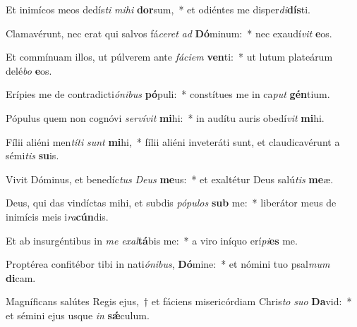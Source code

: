 \item Et inimícos meos dedís\textit{ti} \textit{mi}\textit{hi} \textbf{dor}sum,~* et odiéntes me disper\textit{di}\textbf{dís}ti.
\item Clamavérunt, nec erat qui salvos fá\textit{ce}\textit{ret} \textit{ad} \textbf{Dó}minum:~* nec exaudí\textit{vit} \textbf{e}os.
\item Et commínuam illos, ut púlverem ante \textit{fá}\textit{ci}\textit{em} \textbf{ven}ti:~* ut lutum plateárum delé\textit{bo} \textbf{e}os.
\item Erípies me de contradicti\textit{ó}\textit{ni}\textit{bus} \textbf{pó}puli:~* constítues me in ca\textit{put} \textbf{gén}tium.
\item Pópulus quem non cognóvi \textit{ser}\textit{ví}\textit{vit} \textbf{mi}hi:~* in audítu auris obedí\textit{vit} \textbf{mi}hi.
\item Fílii aliéni men\textit{tí}\textit{ti} \textit{sunt} \textbf{mi}hi,~* fílii aliéni inveteráti sunt, et claudicavérunt a sémi\textit{tis} \textbf{su}is.
\item Vivit Dóminus, et benedíc\textit{tus} \textit{De}\textit{us} \textbf{me}us:~* et exaltétur Deus salú\textit{tis} \textbf{me}æ.
\item Deus, qui das vindíctas mihi, et subdis \textit{pó}\textit{pu}\textit{los} \textbf{sub} me:~* liberátor meus de inimícis meis i\textit{ra}\textbf{cún}dis.
\item Et ab insurgéntibus in \textit{me} \textit{ex}\textit{al}\textbf{tá}bis me:~* a viro iníquo erí\textit{pi}\textbf{es} me.
\item Proptérea confitébor tibi in nati\textit{ó}\textit{ni}\textit{bus}, \textbf{Dó}mine:~* et nómini tuo psal\textit{mum} \textbf{di}cam.
\item Magníficans salútes Regis ejus,~† et fáciens misericórdiam Chris\textit{to} \textit{su}\textit{o} \textbf{Da}vid:~* et sémini ejus usque \textit{in} \textbf{sǽ}culum.
